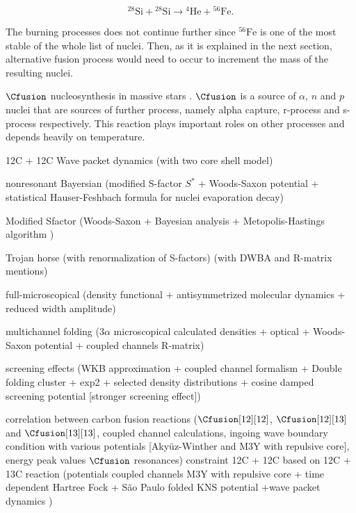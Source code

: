 \documentclass[openany]{book}
\begin{document}
\begin{equation} \label{eq:reaction_28Sifusion_alpha56Fe}
	\mathrm{{}^{28}Si + {}^{28}Si \rightarrow {}^{4}He + {}^{56}Fe }.
\end{equation}

The burning processes does not continue further since $\mathrm{^{56}Fe }$ is one of the most stable of the whole list of nuclei. Then, as it is explained in the next section, alternative fusion process would need to occur to increment the mass of the resulting nuclei.

$\Cfusion$ nucleosynthesis in massive stars \cite{pignatari_hirschi_wiescher_gallino_bennett_beard_fryer_herwig_rockefeller_timmes_et_2012}. $\Cfusion$ is a source of $\alpha$, $n$ and $p$ nuclei that are sources of further process, namely alpha capture, r-process and s-process respectively. 
This reaction plays important roles on other processes and depends heavily on temperature.

12C + 12C Wave packet dynamics (with two core shell model) \cite{diaz-torres_wiescher_2018}

nonresonant Bayersian (modified S-factor $S^{*}$ + Woods-Saxon potential + statistical Hauser-Feshbach formula for nuclei evaporation decay)\cite{li_fang_bucher_li_ru_tang_2020}

Modified Sfactor (Woods-Saxon + Bayesian analysis + Metopolis-Hastings algorithm ) \cite{luo_wen_lin_yang_jia_yang_huang_chang_zhang_yang_et_2022}

Trojan horse (with renormalization of S-factors) \cite{mukhamedzhanov_pang_kadyrov_2019}
 (with DWBA and R-matrix mentions) \cite{mukhamedzanov_2022}
 
full-microscopical (density functional +  antisymmetrized molecular dynamics + reduced width amplitude) \cite{taniguchi_kimura_2021}

multichannel folding ($3\alpha$ microscopical calculated densities + optical + Woods-Saxon potential + coupled channels R-matrix) \cite{assuncao_descouvemont_2016}

screening effects (WKB approximation + coupled channel formalism + Double folding cluster + exp2 + selected density distributions + cosine damped screening potential [stronger screening effect]) \cite{koyuncu_soylu_2018}

correlation between carbon fusion reactions ($\Cfusion[12][12]$, $\Cfusion[12][13]$ and  $\Cfusion[13][13]$, coupled channel calculations, ingoing wave boundary condition with various potentials [Akyüz-Winther and M3Y with repulsive core], energy peak values $\Cfusion$ resonances) \cite{notani_esbensen_fang_bucher_davies_jiang_lamm_lin_ma_martin_et_2012}
constraint 12C + 12C based on 12C + 13C reaction (potentials coupled channels M3Y with repulsive core + time dependent Hartree Fock + São Paulo folded KNS potential +wave packet dynamics ) \cite{zhang_wang_tudor_bucher_burducea_chen_chen_chesneanu_chilug_gasques_et_2020}
\end{document}
